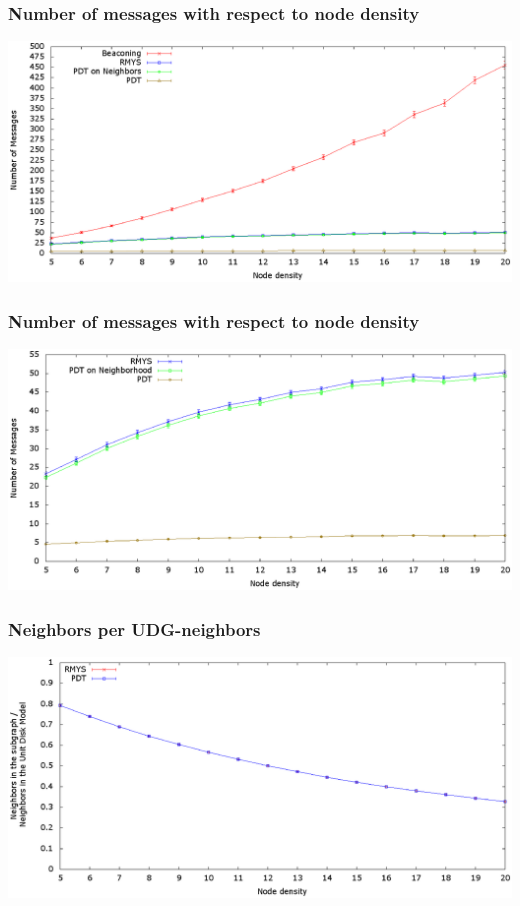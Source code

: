 \documentclass[compress]{beamer}
\begin{document}
\begin{frame} 
\frametitle{Number of messages with respect to node density}
\center	\includegraphics[width=1.0\linewidth]{RMYS_PDT_Beaconing_Neighbors.eps}
\end{frame}

\begin{frame} 
\frametitle{Number of messages with respect to node density}
\center	\includegraphics[width=1.0\linewidth]{RMYS_PDT_Neighbors.eps}
\end{frame}

\begin{frame} 
\frametitle{Neighbors per UDG-neighbors}
\center	\includegraphics[width=1.0\linewidth]{RMYS_PDT_UDGNeighborsRatio.eps}
\end{frame}
\end{document}
